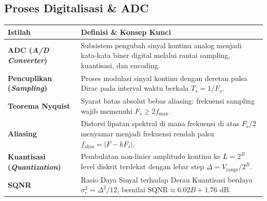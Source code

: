 \documentclass[11pt,a4paper]{article}
\begin{document}
\subsection{Proses Digitalisasi \& ADC}
\begin{table}[h!]
\centering
\small
\begin{tabularx}{\textwidth}{l>{\raggedright\arraybackslash}X}
\toprule
\textbf{Istilah} & \textbf{Definisi \& Konsep Kunci} \\
\midrule
\textbf{ADC (\textit{A/D Converter})} & Subsistem pengubah sinyal kontinu analog menjadi kata-kata biner digital melalui rantai sampling, kuantisasi, dan encoding. \\
\textbf{Pencuplikan (\textit{Sampling})} & Proses modulasi sinyal kontinu dengan deretan pulsa Dirac pada interval waktu berkala $T_s = 1/F_s$. \\
\textbf{Teorema Nyquist} & Syarat batas absolut bebas aliasing: frekuensi sampling wajib memenuhi $F_s \ge 2 f_{\max}$. \\
\textbf{Aliasing} & Distorsi lipatan spektral di mana frekuensi di atas $F_s/2$ menyamar menjadi frekuensi rendah palsu $f_{\text{alias}} = |F - k F_s|$. \\
\textbf{Kuantisasi (\textit{Quantization})} & Pembulatan non-linier amplitudo kontinu ke $L = 2^B$ level diskrit terdekat dengan lebar step $\Delta = V_{\text{range}}/2^B$. \\
\textbf{SQNR} & Rasio Daya Sinyal terhadap Derau Kuantisasi berdaya $\sigma_e^2 = \Delta^2/12$, bernilai $\text{SQNR} \approx 6.02 B + 1.76\text{ dB}$. \\
\bottomrule
\end{tabularx}
\end{table}
\end{document}
